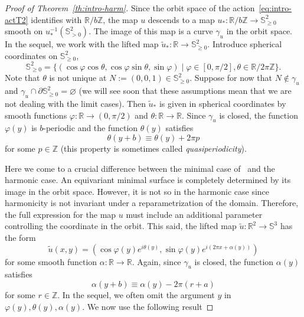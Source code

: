 \documentclass{amsart}
\let\ge\geqslant
\let\emptyset\varnothing
\let\phi\varphi
\theoremstyle{plain}
\theoremstyle{definition}
\theoremstyle{remark}
\begin{document}
\begin{proof}[Proof of Theorem~\ref{th:intro-harm}]
Since the orbit space of the action~\eqref{eq:intro-actT2} identifies with
\(\mathbb R/b\mathbb Z\), the map \(u\) descends to a map \(u_*\colon\mathbb
R/b\mathbb Z\to\mathbb S_{\ge 0}^2\) smooth on \(u_*^{-1}(\mathbb S_{>0}^2)\).
The image of this map is a curve \(\gamma_u\) in the orbit space. In the sequel,
we work with the lifted map \(\tilde u_*\colon\mathbb R\to\mathbb S_{\ge 0}^2\).
Introduce spherical coordinates on \(\mathbb S_{\ge 0}^2\),
\[
\mathbb S_{\ge 0}^2=\{(\cos\phi\cos\theta,\cos\phi\sin\theta,\sin\phi)\mid
\phi\in [0,\pi/2],\theta\in\mathbb R/2\pi\mathbb Z\}.
\]
Note that \(\theta\) is not unique at \(N:=(0,0,1)\in\mathbb S_{\ge 0}^2\).
Suppose for now that \(N\notin\gamma_u\) and \(\gamma_u\cap\partial\mathbb
S_{\ge 0}^2=\emptyset\) (we will see soon that these assumptions mean that we
are not dealing with the limit cases). Then \(\tilde u_*\) is given in spherical
coordinates by smooth functions \(\phi\colon\mathbb R\to (0,\pi/2)\) and
\(\theta\colon\mathbb R\to\mathbb R\). Since \(\gamma_u\) is closed, the
function \(\phi(y)\) is \(b\)-periodic and the function \(\theta(y)\) satisfies
\begin{equation}\label{eq:harm-thper}
\theta(y+b)\equiv\theta(y)+2\pi p
\end{equation}
for some \(p\in\mathbb Z\) (this property is sometimes called
\emph{quasiperiodicity}).

Here we come to a crucial difference between the minimal case of~\cite{HL1971}
and the harmonic case. An equivariant minimal surface is completely determined
by its image in the orbit space. However, it is not so in the harmonic case
since harmonicity is not invariant under a reparametrization of the domain.
Therefore, the full expression for the map \(u\) must include an additional
parameter controlling the coordinate in the orbit. This said, the lifted map
\(\tilde u\colon\mathbb R^2\to\mathbb S^3\) has the form
\[
\tilde u(x,y)=(\cos\phi(y)e^{i\theta(y)},\sin\phi(y)e^{i(2\pi
x+\alpha(y))})
\]
for some smooth function \(\alpha\colon\mathbb R\to\mathbb R\). Again, since
\(\gamma_u\) is closed, the function \(\alpha(y)\) satisfies
\begin{equation}\label{eq:harm-alper}
\alpha(y+b)\equiv\alpha(y)-2\pi (r+a)
\end{equation}
for some \(r\in\mathbb Z\). In the sequel, we often omit the argument \(y\) in
\(\phi(y),\theta(y),\alpha(y)\). We now use the following result


\end{proof}
\end{document}
